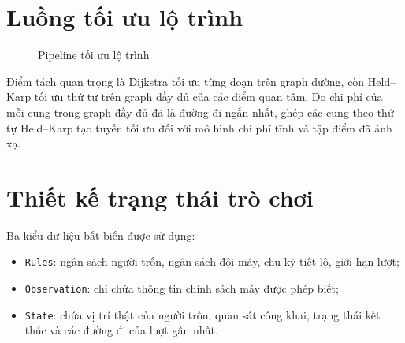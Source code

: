 \section{Luồng tối ưu lộ trình}

\begin{figure}[H]
\centering
{}
\caption{Pipeline tối ưu lộ trình}
\label{fig:route-pipeline}
\end{figure}

Điểm tách quan trọng là Dijkstra tối ưu từng đoạn trên graph đường, còn
Held--Karp tối ưu thứ tự trên graph đầy đủ của các điểm quan tâm. Do chi phí của
mỗi cung trong graph đầy đủ đã là đường đi ngắn nhất, ghép các cung theo thứ tự
Held--Karp tạo tuyến tối ưu đối với mô hình chi phí tĩnh và tập điểm đã ánh xạ.

\section{Thiết kế trạng thái trò chơi}

Ba kiểu dữ liệu bất biến được sử dụng:
\begin{itemize}
  \item \texttt{Rules}: ngân sách người trốn, ngân sách đội máy, chu kỳ tiết lộ,
  giới hạn lượt;
  \item \texttt{Observation}: chỉ chứa thông tin chính sách máy được phép biết;
  \item \texttt{State}: chứa vị trí thật của người trốn, quan sát công khai,
  trạng thái kết thúc và các đường đi của lượt gần nhất.
\end{itemize}

